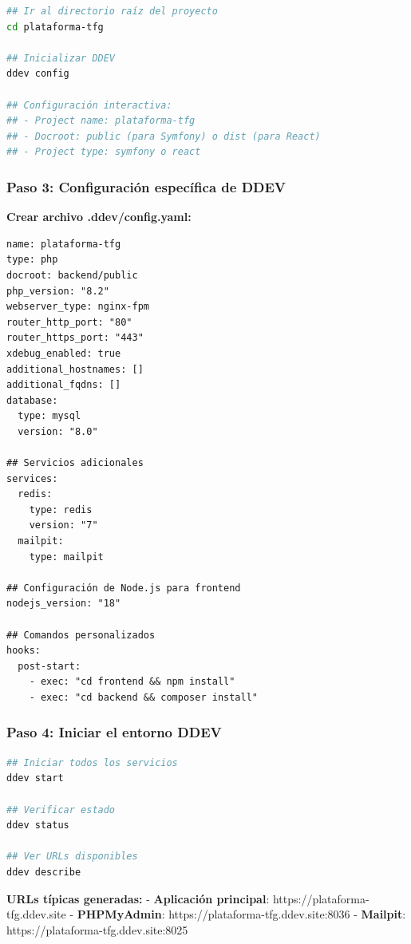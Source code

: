 \documentclass[12pt,a4paper,oneside]{report}
\begin{document}
\begin{lstlisting}[language=bash]
## Ir al directorio raíz del proyecto
cd plataforma-tfg

## Inicializar DDEV
ddev config

## Configuración interactiva:
## - Project name: plataforma-tfg
## - Docroot: public (para Symfony) o dist (para React)
## - Project type: symfony o react
\end{lstlisting}

\subsubsection{Paso 3: Configuración específica de
DDEV}\label{paso-3-configuraciuxf3n-especuxedfica-de-ddev}

\textbf{Crear archivo .ddev/config.yaml:}

\begin{lstlisting}
name: plataforma-tfg
type: php
docroot: backend/public
php_version: "8.2"
webserver_type: nginx-fpm
router_http_port: "80"
router_https_port: "443"
xdebug_enabled: true
additional_hostnames: []
additional_fqdns: []
database:
  type: mysql
  version: "8.0"
  
## Servicios adicionales
services:
  redis:
    type: redis
    version: "7"
  mailpit:
    type: mailpit

## Configuración de Node.js para frontend
nodejs_version: "18"

## Comandos personalizados
hooks:
  post-start:
    - exec: "cd frontend && npm install"
    - exec: "cd backend && composer install"
\end{lstlisting}

\subsubsection{Paso 4: Iniciar el entorno
DDEV}\label{paso-4-iniciar-el-entorno-ddev}

\begin{lstlisting}[language=bash]
## Iniciar todos los servicios
ddev start

## Verificar estado
ddev status

## Ver URLs disponibles
ddev describe
\end{lstlisting}

\textbf{URLs típicas generadas:} - \textbf{Aplicación principal}:
https://plataforma-tfg.ddev.site - \textbf{PHPMyAdmin}:
https://plataforma-tfg.ddev.site:8036 - \textbf{Mailpit}:
https://plataforma-tfg.ddev.site:8025
\end{document}
